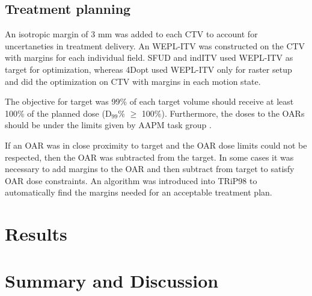 \documentclass[type=dr, dr=rernat, accentcolor=tud7b,colorbacktitle, bigchapter, openright, twoside, 12pt ]{tudthesis}
\begin{document}
\subsection{Treatment planning}

An isotropic margin of 3 mm was added to each CTV to account for uncertaneties in treatment delivery. An WEPL-ITV was constructed on the CTV with margins for each individual field. 
SFUD and indITV used WEPL-ITV as target for optimization, whereas 4Dopt used WEPL-ITV only for raster setup and did the optimization on CTV with margins in each motion state.
  
The objective for target was 99\% of each target volume should receive at least 100\% of the planned dose (D$_{99}$\% $\geq$ 100\%). Furthermore, the doses to the OARs should be under the limits given by AAPM task group \cite{Benedict2010}. 

If an OAR was in close proximity to target and the OAR dose limits could not be respected, then the OAR was subtracted from the target. In some cases it was necessary to add margins to the OAR and then subtract from target to satisfy OAR dose constraints.
An algorithm was introduced into TRiP98 to automatically find the margins needed for an acceptable treatment plan.

\section{Results}

\section{Summary and Discussion}






{}
% 
\end{document}
